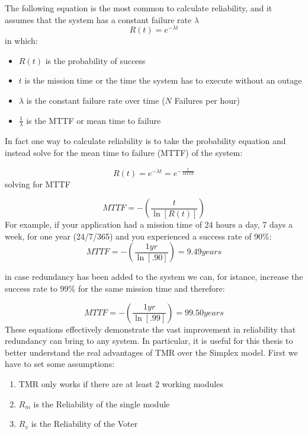 \documentclass[./dissertation.tex]{subfiles}
\begin{document}
The following equation is the most common to calculate reliability, and it assumes that the system has a constant failure rate $\lambda$
\begin{equation}
    R(t) = e^{-\lambda t}
\end{equation}
in which:
\begin{itemize}
    \item $R(t)$ is the probability of success
    \item $t$ is the mission time or the time the system has to execute without an outage
    \item $\lambda$ is the constant failure rate over time ($N$ Failures per hour)
    \item $\frac{1}{\lambda}$ is the MTTF or mean time to failure
\end{itemize}

In fact one way  to calculate reliability is to take the probability equation and instead solve for the mean time to failure (MTTF) of the
system:

\begin{equation}
    R(t) = e^{-\lambda t } = e^{-\frac{t}{MTTF}}
\end{equation}
solving for MTTF

\begin{equation}
    MTTF = -\left( \frac{t}{\ln{[R(t)]}} \right)
\end{equation}
For example, if your application had a mission time of 24 hours a day, 7 days a week, for one year (24/7/365) and you experienced a
success rate of 90\%:
\begin{equation}
    MTTF = -\left( \frac{1yr}{\ln[.90]} \right) = 9.49 years
\end{equation}

in case redundancy has been added to the system we can, for istance, increase the success rate to 99\% for the same mission time and therefore:

\begin{equation}
    MTTF = -\left( \frac{1yr}{\ln[.99]} \right) = 99.50 years
\end{equation}
These equations effectively demonstrate the vast improvement in reliability that redundancy can bring to any system.
\newpage
In particular, it is useful for this thesis to better understand the real advantages of TMR over the Simplex model. First we have to set some assumptions:
\begin{enumerate}
    \item TMR only works if there are at least 2 working modules
    \item $R_m$ is the Reliability of the single module
    \item $R_v$ is the Reliability of the Voter
\end{enumerate}
\end{document}
